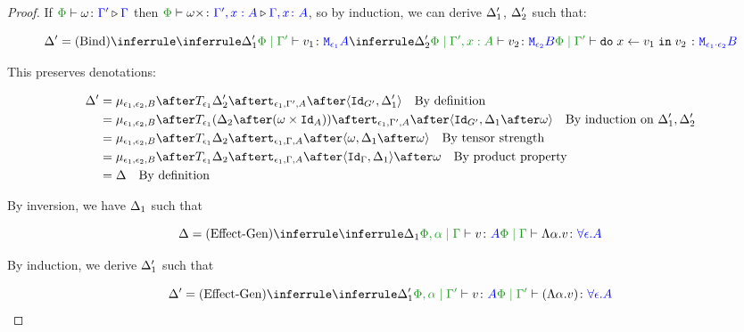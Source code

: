 \documentclass{report}
\begin{document}
\begin{framed}
\begin{proof}
            If $\ewrel{\P}{\w}{\G'}{\G}$ then $\ewrel{\P}{\w\x}{\G',x:A}{\gax}$, so by induction, we can derive $\Delta_1'$, $\Delta_2'$ such that:
        
            \begin{equation}
                \D' = \ntreeruleII{\vbind}{
                    \treeruleI{\D_1'}{\etyperelation{\P}{\G'}{v_1}{\M{\e_1}{A}}}
                    }{
                    \treeruleI{\D_2'}{\etyperelation{\P}{\G',x: A}{v_2}{\M{\e_2}{B}}}
                }{
                    \etyperelation{\P}{\G'}{\doin{x}{v_1}{v_2}}{\M{\e_1\dot\e_2}{B}}
                }
            \end{equation}
        
            This preserves denotations:
        
            \begin{align*}
                \D' & = \bind{\e_1}{\e_2}{B}\after\T{\e_1}{\D_2'}\after\tstrength{\e_1}{\G'}{A}\after\pr{\Id{G'}}{\D_1'}\qt{By definition}\\
                & = \bind{\e_1}{\e_2}{B}\after\T{\e_1}{(\D_2\after(\w\times\Id{A}))}\after\tstrength{\e_1}{\G'}{A}\after\pr{\Id{G'}}{\D_1\after\w}\qt{By induction on $\D_1', \D_2'$}\\
                & = \bind{\e_1}{\e_2}{B}\after\T{\e_1}{\D_2}\after\tstrength{\e_1}{\G}{A}\after\pr{\w}{\D_1\after\w}\qt{By tensor strength}\\
                & = \bind{\e_1}{\e_2}{B}\after\T{\e_1}{\D_2}\after\tstrength{\e_1}{\G}{A}\after\pr{\idg}{\D_1}\after\w\qt{By product property}\\
                & = \D \qt{By definition}
            \end{align*}
        
        
        
            \case{\vgen}
        
            By inversion, we have $\Delta_1$ such that
            
            \begin{equation}
                \D = \ntreeruleI{\vgen}{\treeruleI{\D_1}{\etyperelation{\P,\a}{\G}{v}{A}}}{\gpetyperelation{\elam{\a}{v}}{\all{\e}{A}}}
            \end{equation}
            
            By induction, we derive $\Delta_1'$ such that
            
            \begin{equation}
                \D' = \ntreeruleI{\vgen}{\treeruleI{\D_1'}{\etyperelation{\P,\a}{\G'}{v}{A}}}{\etyperelation{\P}{\G'}{(\elam{\a}{v})}{\all{\e}{A}}}
            \end{equation}
            

\end{proof}
\end{framed}
\end{document}
